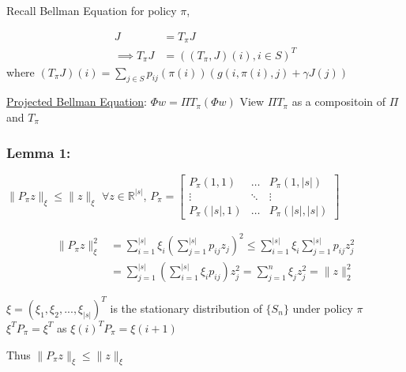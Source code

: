 \documentclass[11pt]{article}
\begin{document}
Recall Bellman Equation for policy \(\pi\),

\begin{align*}
J &= T_{\pi}J \\
\implies T_{\pi}J &= ((T_{\pi}, J)(i), i \in S)^T
\end{align*}
where \((T_{\pi}J)(i) = \sum_{j \in S} p_{ij}(\pi(i))(g(i, \pi(i), j) + \gamma J(j))\)

\uline{Projected Bellman Equation}: \(\Phi w = \Pi T_{\pi}(\Phi w)\)
View \(\Pi T_{\pi}\) as a compositoin of \(\Pi\) and \(T_{\pi}\)

\subsubsection{Lemma 1:}
\label{sec:org6a69806}
\(\lVert P_{\pi} z \rVert_{\xi} \leq \lVert z \rVert_{\xi}\) \(\forall z \in \mathbb{R}^{|s|}\), \(P_{\pi} = \begin{bmatrix} P_{\pi}(1,1) & \dots & P_{\pi}(1, |s|) \\ \vdots & \ddots & \vdots \\ P_{\pi}(|s|, 1) & \dots & P_{\pi}(|s|, |s|) \end{bmatrix}\)


\begin{align*}
\lVert P_{\pi}z \rVert_{\xi}^2 &= \sum_{i=1}^{|s|} \xi_i \left( \sum_{j=1}^{|s|}p_{ij}z_j \right)^2
\leq \sum_{i=1}^{|s|}\xi_i \sum_{j=1}^{|s|}p_{ij}z_j^2 \\
&= \sum_{j=1}^{|s|} \left( \sum_{i=1}^{|s|} \xi_i p_{ij} \right) z_j^2
= \sum_{j=1}^n \xi_jz_j^2 = \lVert z \rVert_2^2
\end{align*}

\(\xi = (\xi_1, \xi_2, ..., \xi_{|s|})^T\) is the stationary distribution of \(\{S_n\}\) under policy \(\pi\)
\(\xi^TP_{\pi} = \xi^T\) as \(\xi(i)^{T}P_{\pi} = \xi(i+1)\)

Thus \(\lVert P_{\pi} z \rVert_{\xi} \leq \lVert z \rVert_{\xi}\)
\end{document}
